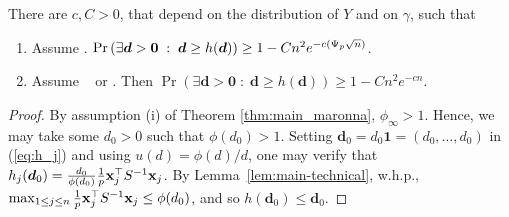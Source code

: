 \documentclass[times,sort&compress,3p]{elsarticle}
\begin{document}
\begin{lemma}
        \label{lem:maronna-existence}
        There are $c,C>0$, that depend on the distribution of $Y$ and on $\gamma$, such that
        \begin{enumerate}
                \item Assume \AssumLC. 
 $\Pr\left(\exists \bm{d}>\bm{0}\;:\;\bm{d}\ge h(\bm{d})\right) \ge 1-Cn^2e^{-c(\Psi_p\sqrt{n})} $.
                \item Assume \AssumIndep~ or \AssumCCPSB. Then      
            $\Pr\left(\exists \bm{d}>\bm{0}\;:\;\bm{d}\ge h(\bm{d})\right) \ge 1-Cn^2e^{-cn} $.
        \end{enumerate}
\end{lemma}
\begin{proof}
        By assumption (i) of Theorem \ref{thm:main_maronna}, $\phi_{\infty}>1$.         Hence, we may take some $d_0>0$ such that $\phi(d_0)>1$. 
        Setting $\bm{d}_0=d_0\bm{1}=(d_0,\ldots,d_0)$ in (\ref{eq:h_j}) and using $u(d)=\phi(d)/d$, 
        one may verify that $h_j(\bm{d}_0)=\frac{d_0}{\phi(d_0)}\frac1p{\bf x}_j^\top S^{-1}{\bf x}_j$. By Lemma~\ref{lem:main-technical}, w.h.p., $\max_{1\le j\le n}\frac1p{\bf x}_j^\top S^{-1}{\bf x}_j\le \phi(d_0)$, and so $h(\bm{d}_0)\le \bm{d}_0$.
        \end{proof}
\end{document}
